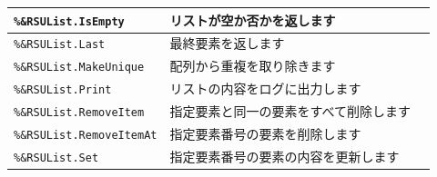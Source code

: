 \begin{center}
{\begin{xltabular}{\textwidth}{|p{4truecm}|X|p{1.2truecm}|}
\hline
\texttt{\%\&RSUList.IsEmpty}&リストが空か否かを返します&\\
\hline
\texttt{\%\&RSUList.Last}&最終要素を返します&\\
\hline
\texttt{\%\&RSUList.MakeUnique}&配列から重複を取り除きます&\\
\hline
\texttt{\%\&RSUList.Print}&リストの内容をログに出力します&\\
\hline
\texttt{\%\&RSUList.RemoveItem}&指定要素と同一の要素をすべて削除します&\\
\hline
\texttt{\%\&RSUList.RemoveItemAt}&指定要素番号の要素を削除します&\\
\hline
\texttt{\%\&RSUList.Set}&指定要素番号の要素の内容を更新します&\\
\hline
\end{xltabular}
}
\end{center}
